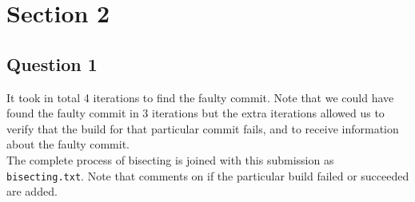 \newpage
\section*{Section 2}
\subsection*{Question 1}

\noindent It took in total 4 iterations to find the faulty commit. Note that we could have found the faulty commit in 3 iterations but the extra iterations allowed us to verify that the build for that particular commit fails, and to receive information about the faulty commit. \\ The complete process of bisecting is joined with this submission as \verb|bisecting.txt|. Note that comments on if the particular build failed or succeeded are added.